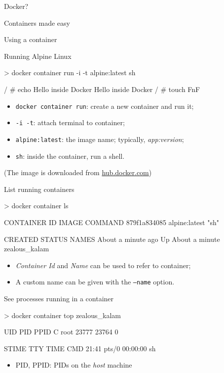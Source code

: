 \documentclass{beamer}
\renewcommand\big[1]{
  \begin{center}
    \Large{#1}
  \end{center}
}
\begin{document}
\begin{frame}
  \big{Docker?}

  \centering Containers made easy
\end{frame}

\begin{frame}
  \centering\Huge{Using a container}
\end{frame}

\begin{frame}[fragile]
  \big{Running Alpine Linux}
  \begin{mylisting}
    > docker container run -i -t alpine:latest sh

    / # echo Hello inside Docker
    Hello inside Docker
    / # touch FnF
  \end{mylisting}
  \begin{itemize}
    \item \texttt{docker container run}: create a new container and run it;
    \item \texttt{-i -t}: attach terminal to container;
    \item \texttt{alpine:latest}: the image name; typically, \emph{app:version};
    \item \texttt{sh}: inside the container, run a shell.
  \end{itemize}
  (The image is downloaded from \url{hub.docker.com})
\end{frame}

\begin{frame}[fragile]
  \big{List running containers}
  \begin{mylisting}
    > docker container ls

CONTAINER ID        IMAGE               COMMAND
879f1a834085        alpine:latest       "sh"

CREATED              STATUS             NAMES
About a minute ago   Up About a minute  zealous_kalam
\end{mylisting}

\begin{itemize}
  \item \emph{Container Id} and \emph{Name} can be used to refer to container;
  \item A custom name can be given with the \texttt{--name} option.
  \end{itemize}
\end{frame}

\begin{frame}[fragile]
  \big{See processes running in a container}
  \begin{mylisting}
    > docker container top zealous_kalam

UID                 PID            PPID           C
root                23777          23764          0

STIME               TTY            TIME           CMD
21:41               pts/0          00:00:00       sh
  \end{mylisting}
  \begin{itemize}
    \item PID, PPID: PIDs on the \emph{host} machine
  \end{itemize}
\end{frame}
\end{document}
